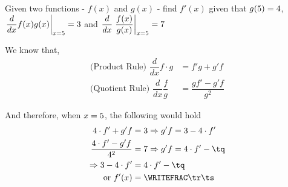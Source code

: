 



\SQUARE\vbtwo\tp
\gcalcexpr[0]\tq{\vbfour * \tp}
\ADD\tq\vbthree\tr
\MULTIPLY{}\ts

\question[3] Given two functions - $f(x)$ and $g(x)$ - find $f'(x)$ given that 
$g(5) = 4$, $\left.\dfrac{d}{dx} f(x)g(x)\right\vert_{x=5} = 3$ and 
$\dfrac{d}{dx}\left.\dfrac{f(x)}{g(x)}\right\vert_{x=5} = 7$

\watchout

\ifprintanswers
\fi 

\begin{solution}[\halfpage]
	We know that, 
	\begin{align}
		\text{(Product Rule) }\dfrac{d}{dx} f\cdot g &= f'g + g'f \\
		\text{(Quotient Rule) }\dfrac{d}{dx}\dfrac{f}{g} &= \dfrac{gf' - g'f}{g^2}
	\end{align}
	
	And therefore, when $x=5$, the following would hold 
	\begin{align}
		\vbtwo\cdot f' + g'f &= \vbthree \Rightarrow g'f = \vbthree - \vbtwo\cdot f' \\
		\dfrac{\vbtwo\cdot f' - g'f }{\vbtwo^2} &= \vbfour \Rightarrow g'f = \vbtwo\cdot f' - \tq \\
		\Rightarrow \vbthree - \vbtwo\cdot f' &= \vbtwo\cdot f' - \tq \\
		\text{ or } f'(x) &= \WRITEFRAC\tr\ts
	\end{align}
\end{solution}

